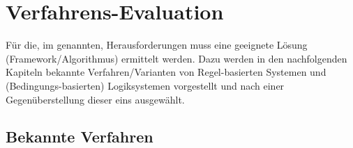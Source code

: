 \section{Verfahrens-Evaluation}\label{sec:verfahrens-evaluation}


Für die, im  genannten, Herausforderungen muss eine geeignete Lösung (Framework/Algorithmus) ermittelt werden.
Dazu werden in den nachfolgenden Kapiteln bekannte Verfahren/Varianten von Regel-basierten Systemen und (Bedingungs-basierten) Logiksystemen vorgestellt und nach einer Gegenüberstellung dieser eins ausgewählt.

\subsection{Bekannte Verfahren}\label{subsec:bekannte-verfahren}

